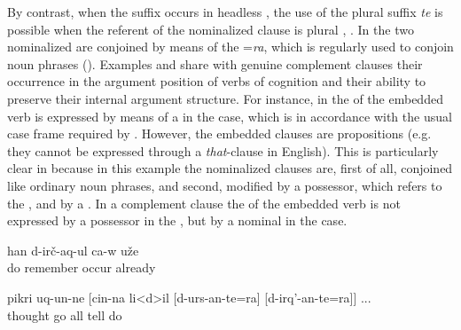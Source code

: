 By contrast, when the suffix occurs in headless , the use of the plural suffix \textit{te} is possible when the referent of the nominalized clause is plural , . In  the two nominalized  are conjoined by means of the  =\textit{ra}, which is regularly used to conjoin noun phrases (). Examples  and  share with genuine complement clauses their occurrence in the argument position of verbs of cognition and their ability to preserve their internal argument structure. For instance, in  the  of the embedded verb is expressed by means of a  in the  case, which is in accordance with the usual case frame required by . However, the embedded clauses are propositions (e.g. they cannot be expressed through a \textit{that}-clause in English). This is particularly clear in   because in this example the nominalized clauses are, first of all, conjoined like ordinary noun phrases, and second, modified by a possessor, which refers to the , and by a . In a complement clause the  of the embedded verb is not expressed by a possessor in the , but by a nominal in the  case. 


%
\begin{exe}
	\ex	\label{ex:He remembered what he had done attributive markers}
		han	d-irč-aq-ul	ca-w	uže\\
			do remember	occur		already\\
	\glt	{}

	\ex	\label{ex:‎‎and thought of what he had said and done}
	\gll	pikri	uq-un-ne	[cin-na	li<d>il	[d-urs-an-te=ra]	[d-irq'-an-te=ra]] ...\\
		thought	go		all	tell	do\\
	\glt	{}
\end{exe}

